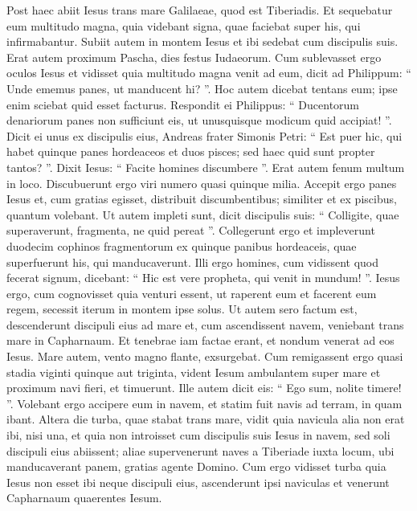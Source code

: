 \begin{biblechapter}
\begin{biblechapter}
\begin{biblechapter}
\begin{biblechapter}
\begin{biblechapter}
\begin{biblechapter}
\verse Post haec abiit Iesus trans mare Galilaeae, quod est Tiberiadis. 
\verse Et sequebatur eum multitudo magna, quia videbant signa, quae faciebat super his, qui infirmabantur. 
\verse Subiit autem in montem Iesus et ibi sedebat cum discipulis suis. 
\verse Erat autem proximum Pascha, dies festus Iudaeorum. 
\verse Cum sublevasset ergo oculos Iesus et vidisset quia multitudo magna venit ad eum, dicit ad Philippum: “ Unde ememus panes, ut manducent hi? ”. 
\verse Hoc autem dicebat tentans eum; ipse enim sciebat quid esset facturus. 
\verse Respondit ei Philippus: “ Ducentorum denariorum panes non sufficiunt eis, ut unusquisque modicum quid accipiat! ”. 
\verse Dicit ei unus ex discipulis eius, Andreas frater Simonis Petri: 
\verse “ Est puer hic, qui habet quinque panes hordeaceos et duos pisces; sed haec quid sunt propter tantos? ”. 
\verse Dixit Iesus: “ Facite homines discumbere ”. Erat autem fenum multum in loco. Discubuerunt ergo viri numero quasi quinque milia. 
\verse Accepit ergo panes Iesus et, cum gratias egisset, distribuit discumbentibus; similiter et ex piscibus, quantum volebant. 
\verse Ut autem impleti sunt, dicit discipulis suis: “ Colligite, quae superaverunt, fragmenta, ne quid pereat ”. 
\verse Collegerunt ergo et impleverunt duodecim cophinos fragmentorum ex quinque panibus hordeaceis, quae superfuerunt his, qui manducaverunt.
 \verse Illi ergo homines, cum vidissent quod fecerat signum, dicebant: “ Hic est vere propheta, qui venit in mundum! ”. 
\verse Iesus ergo, cum cognovisset quia venturi essent, ut raperent eum et facerent eum regem, secessit iterum in montem ipse solus.
 \verse Ut autem sero factum est, descenderunt discipuli eius ad mare 
\verse et, cum ascendissent navem, veniebant trans mare in Capharnaum. Et tenebrae iam factae erant, et nondum venerat ad eos Iesus. 
\verse Mare autem, vento magno flante, exsurgebat. 
\verse Cum remigassent ergo quasi stadia viginti quinque aut triginta, vident Iesum ambulantem super mare et proximum navi fieri, et timuerunt. 
\verse Ille autem dicit eis: “ Ego sum, nolite timere! ”. 
\verse Volebant ergo accipere eum in navem, et statim fuit navis ad terram, in quam ibant.
 \verse Altera die turba, quae stabat trans mare, vidit quia navicula alia non erat ibi, nisi una, et quia non introisset cum discipulis suis Iesus in navem, sed soli discipuli eius abiissent; 
\verse aliae supervenerunt naves a Tiberiade iuxta locum, ubi manducaverant panem, gratias agente Domino. 
\verse Cum ergo vidisset turba quia Iesus non esset ibi neque discipuli eius, ascenderunt ipsi naviculas et venerunt Capharnaum quaerentes Iesum. 

\end{biblechapter}
\end{biblechapter}
\end{biblechapter}
\end{biblechapter}
\end{biblechapter}
\end{biblechapter}
